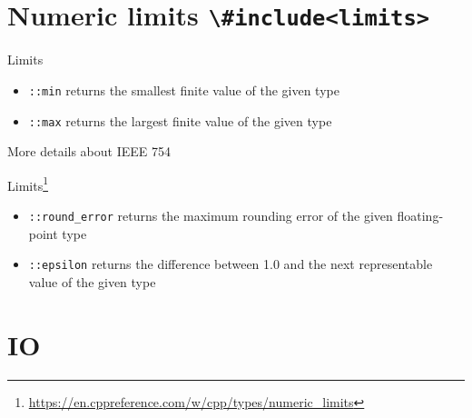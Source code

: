 \documentclass[\classoption]{beamer}
\begin{document}
\section{Numeric limits \lstinline|\#include<limits>|}

\begin{frame}{Limits}



\begin{itemize}
\item \lstinline|::min| returns the smallest finite value of the given type 
\item \lstinline|::max| returns the largest finite value of the given type 
\end{itemize}
More details about IEEE 754~\cite{goldberg1991every,4610935}
\end{frame}


\begin{frame}{Limits\footnote{\tiny\url{https://en.cppreference.com/w/cpp/types/numeric_limits}}}



\begin{itemize}
\item \lstinline|::round_error| returns the maximum rounding error of the given floating-point type  
\item \lstinline|::epsilon| returns the difference between 1.0 and the next representable value of the given type 
\end{itemize}

\end{frame}

\section{IO}
\end{document}
